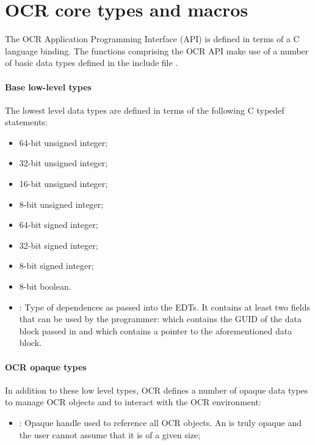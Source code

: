 %

\section{OCR core types and macros}
\label{sec:OCRtypesmacros}

The OCR Application Programming Interface (API) is defined in terms of a
C language binding. The functions comprising the OCR API make use of a number of
basic data types defined in the include file .
\paragraph*{Base low-level types}
The lowest level data types are defined in terms of the following C typedef
statements:
\begin{itemize}
\item \hypertarget{type_u64}{} 64-bit unsigned integer;
\item \hypertarget{type_u32}{} 32-bit unsigned integer;
\item \hypertarget{type_u16}{} 16-bit unsigned integer;
\item \hypertarget{type_u8}{} 8-bit unsigned integer;
\item \hypertarget{type_s64}{} 64-bit signed integer;
\item \hypertarget{type_s32}{} 32-bit signed integer;
\item \hypertarget{type_s8}{} 8-bit signed integer;
\item \hypertarget{type_bool}{} 8-bit boolean.
\item \hypertarget{type_ocrEdtDep_t}{}: Type of
  dependences as passed into the EDTs. It contains at least two fields
  that can be used by the programmer:  which contains the
  GUID of the data block passed in and  which contains a
  pointer to the aforementioned data block.
\end{itemize}
\paragraph*{OCR opaque types}
In addition to these low level types, OCR defines a number of opaque data types
to manage OCR objects and to interact with the OCR environment:
\begin{itemize}
\item \hypertarget{type_ocrGuid_t}{}: Opaque handle used to
reference all OCR objects. An  is truly opaque and
the user cannot assume that it is of a given size;
\end{itemize}
